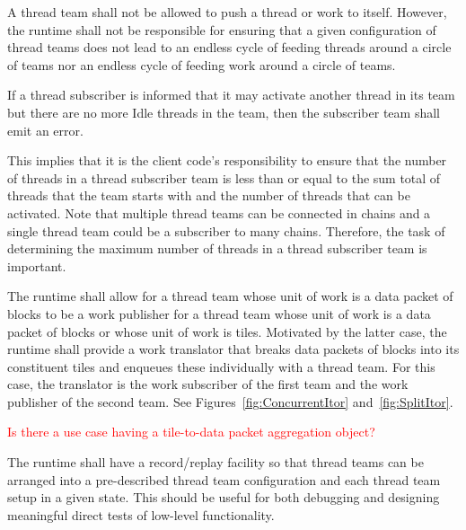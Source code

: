\documentclass{article}
\begin{document}
\begin{req}
A thread team shall not be allowed to push a thread or work to itself.  However,
the runtime shall not be responsible for ensuring that a given configuration of
thread teams does not lead to an endless cycle of feeding threads around a
circle of teams nor an endless cycle of feeding work around a circle of teams.
\end{req}

\begin{req}
\label{req:ThreadBalance}
If a thread subscriber is informed that it may activate another thread in its
team but there are no more Idle threads in the team, then the subscriber team
shall emit an error.
\end{req}

This implies that it is the client code's responsibility to ensure that the
number of threads in a thread subscriber team is less than or equal to the sum
total of threads that the team starts with and the number of threads that can be
activated.  Note that multiple thread teams can be connected in chains and a
single thread team could be a subscriber to many chains.  Therefore, the task of
determining the maximum number of threads in a thread subscriber team is important.

\begin{req}
The runtime shall allow for a thread team whose unit of work is a data packet of
blocks to be a work publisher for a thread team whose unit of work is a data
packet of blocks or whose unit of work is tiles.  Motivated by the latter case,
the runtime shall provide a work translator that breaks data packets of blocks into its
constituent tiles and enqueues these individually with a thread team.  For this
case, the translator is the work subscriber of the first team and the work
publisher of the second team.  See Figures~\ref{fig:ConcurrentItor}
and~\ref{fig:SplitItor}.
\end{req}

\textcolor{red}{Is there a use case having a tile-to-data packet aggregation
object?}

\begin{req}
The runtime shall have a record/replay facility so that thread teams can be
arranged into a pre-described thread team configuration and each thread team setup in a given
state.  This should be useful for both debugging and designing meaningful direct
tests of low-level functionality.
\end{req}
\end{document}
